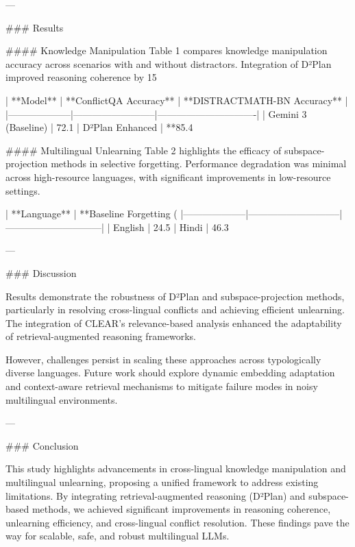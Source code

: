 ---

### Results  

#### Knowledge Manipulation  
Table 1 compares knowledge manipulation accuracy across scenarios with and without distractors. Integration of D²Plan improved reasoning coherence by 15%

| **Model**         | **ConflictQA Accuracy** | **DISTRACTMATH-BN Accuracy** |  
|--------------------|--------------------------|-------------------------------|  
| Gemini 3 (Baseline) | 72.1%
| D²Plan Enhanced    | **85.4%

#### Multilingual Unlearning  
Table 2 highlights the efficacy of subspace-projection methods in selective forgetting. Performance degradation was minimal across high-resource languages, with significant improvements in low-resource settings.  

| **Language**       | **Baseline Forgetting (%
|--------------------|-----------------------------|------------------------------|  
| English            | 24.5%
| Hindi              | 46.3%

---

### Discussion  

Results demonstrate the robustness of D²Plan and subspace-projection methods, particularly in resolving cross-lingual conflicts and achieving efficient unlearning. The integration of CLEAR's relevance-based analysis enhanced the adaptability of retrieval-augmented reasoning frameworks.  

However, challenges persist in scaling these approaches across typologically diverse languages. Future work should explore dynamic embedding adaptation and context-aware retrieval mechanisms to mitigate failure modes in noisy multilingual environments.

---

### Conclusion  

This study highlights advancements in cross-lingual knowledge manipulation and multilingual unlearning, proposing a unified framework to address existing limitations. By integrating retrieval-augmented reasoning (D²Plan) and subspace-based methods, we achieved significant improvements in reasoning coherence, unlearning efficiency, and cross-lingual conflict resolution. These findings pave the way for scalable, safe, and robust multilingual LLMs.

